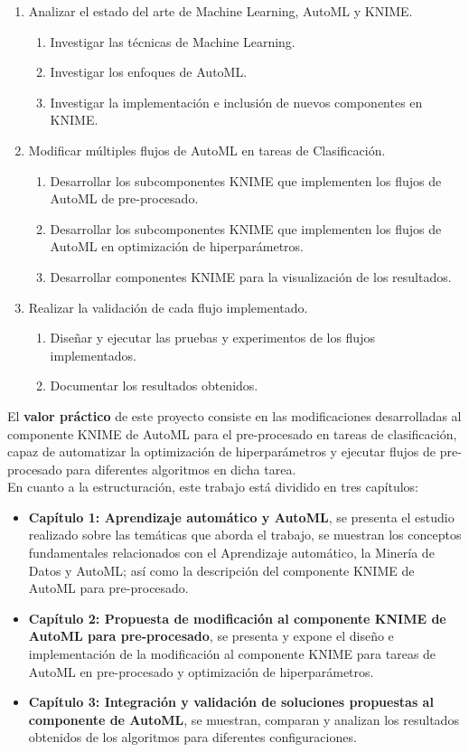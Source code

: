 \begin{enumerate}
	\item Analizar el estado del arte de Machine Learning, AutoML y KNIME. 
	\begin{enumerate}
		\item Investigar las técnicas de Machine Learning. 
		\item Investigar los enfoques de AutoML. 
		\item Investigar la implementación e inclusión de nuevos componentes en KNIME.
	\end{enumerate}
	\item Modificar múltiples flujos de AutoML en tareas de Clasificación. 
	\begin{enumerate}
		\item Desarrollar los subcomponentes KNIME que implementen los flujos de AutoML de pre-procesado. 
		\item Desarrollar los subcomponentes KNIME que implementen los flujos de AutoML en optimización de hiperparámetros.
		\item Desarrollar componentes KNIME para la visualización de los resultados. 
	\end{enumerate}
	\item Realizar la validación de cada flujo implementado.
	\begin{enumerate}
		\item Diseñar y ejecutar las pruebas y experimentos de los flujos implementados. 
		\item Documentar los resultados obtenidos.
	\end{enumerate} 
\end{enumerate}

El \textbf{valor práctico} de este proyecto consiste en las modificaciones desarrolladas al componente KNIME de AutoML para el pre-procesado en tareas de clasificación, capaz de automatizar la optimización de hiperparámetros y ejecutar flujos de pre-procesado para diferentes algoritmos en dicha tarea. \\
En cuanto a la estructuración, este trabajo está dividido en tres capítulos:
\begin{itemize}
	\item \textbf{Capítulo 1: Aprendizaje automático y AutoML}, se presenta el estudio realizado sobre las temáticas que aborda el trabajo, se muestran los conceptos fundamentales relacionados con el Aprendizaje automático, la Minería de Datos y AutoML; así como la descripción del componente KNIME de AutoML para pre-procesado.
	\item \textbf{Capítulo 2: Propuesta de modificación al componente KNIME de AutoML para pre-procesado}, se presenta y expone el diseño e implementación de la modificación al componente KNIME para tareas de AutoML en pre-procesado y optimización de hiperparámetros.
		\item \textbf{Capítulo 3: Integración y validación de soluciones propuestas al componente de AutoML}, se muestran, comparan y analizan los resultados obtenidos de los algoritmos para diferentes configuraciones.
\end{itemize}




